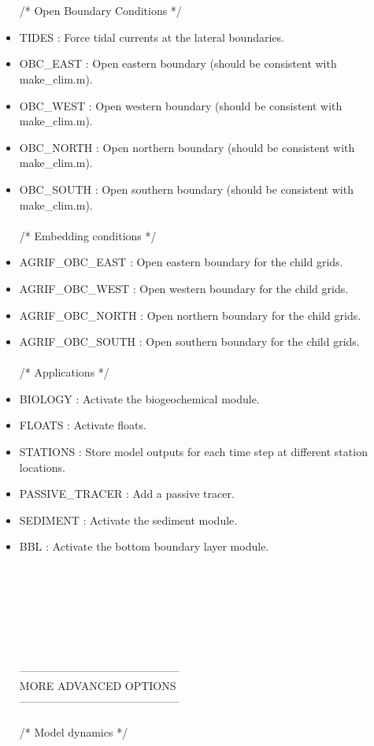 \begin{itemize}
\\ \\ /*                       Open Boundary Conditions */
\item TIDES  : Force tidal currents at the lateral boundaries.
\item OBC\_EAST : Open eastern boundary (should be consistent with make\_clim.m).
\item OBC\_WEST : Open western boundary (should be consistent with make\_clim.m).
\item OBC\_NORTH : Open northern boundary (should be consistent with make\_clim.m).
\item OBC\_SOUTH : Open southern boundary (should be consistent with make\_clim.m).
\\ \\ /*                       Embedding conditions */
\item AGRIF\_OBC\_EAST  : Open eastern boundary for the child grids.
\item AGRIF\_OBC\_WEST   : Open western boundary for the child grids.
\item AGRIF\_OBC\_NORTH   : Open northern boundary for the child grids.
\item AGRIF\_OBC\_SOUTH   : Open southern boundary for the child grids.
\\ \\ /*                       Applications */
\item BIOLOGY : Activate the biogeochemical module. 
\item FLOATS : Activate floats.
\item STATIONS : Store model outputs for each time step at different station locations.
\item PASSIVE\_TRACER : Add a passive tracer.
\item SEDIMENT : Activate the sediment module.
\item BBL : Activate the bottom boundary layer module.
\\\\\\\\\\\\\\\\
--------------------------------------------\\
   MORE ADVANCED OPTIONS \\
--------------------------------------------
\\ \\ /*                       Model dynamics */

\end{itemize}
